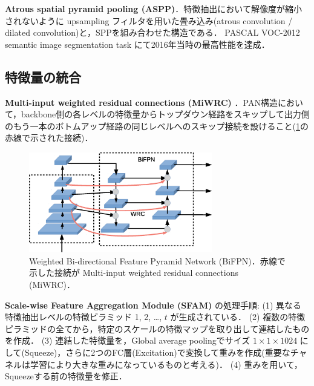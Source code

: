 \documentclass[originalpaper,fleqn]{jsaiart}     %
\begin{document}
{\bf Atrous spatial pyramid pooling (ASPP)}\cite{CPKMY17}．特徴抽出において解像度が縮小されないように upsampling フィルタを用いた畳み込み(atrous convolution / dilated convolution)と，SPPを組み合わせた構造である．
PASCAL VOC-2012 semantic image segmentation task にて2016年当時の最高性能を達成．

\subsection{特徴量の統合}
{\bf Multi-input weighted residual connections (MiWRC)} \cite{TPL20}．PAN構造において，backbone側の各レベルの特徴量からトップダウン経路をスキップして出力側のもう一本のボトムアップ経路の同じレベルへのスキップ接続を設けること(\ref{fig:archi_wrc}の赤線で示された接続)．
\begin{figure}[tb]
    \begin{center}
        \includegraphics[width=8cm,clip]{fig/archi_BiFPN,WRC.eps}
    \end{center}
    \caption{ Weighted Bi-directional Feature Pyramid Network (BiFPN)．赤線で示した接続が Multi-input weighted residual connections (MiWRC)．}
    \label{fig:archi_wrc}
\end{figure}

{\bf Scale-wise Feature Aggregation Module (SFAM)} \cite{ZSWTCCL19} の処理手順:
(1) 異なる特徴抽出レベルの特徴ピラミッド 1, 2, …, $t$ が生成されている．
(2) 複数の特徴ピラミッドの全てから，特定のスケールの特徴マップを取り出して連結したものを作成．
(3) 連結した特徴量を，Global average poolingでサイズ $1{\times}1{\times}1024$ にして(Squeeze)，さらに2つのFC層(Excitation)で変換して重みを作成(重要なチャネルは学習により大きな重みになっているものと考える)．
(4) 重みを用いて，Squeezeする前の特徴量を修正．
\end{document}
